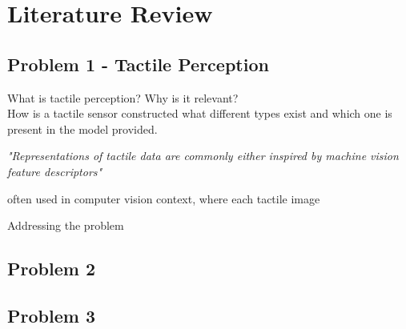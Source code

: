 
\chapter{Literature Review} \label{ch:litterature-review}



\section{Problem 1 - Tactile Perception} \label{sec:lit-rev-problem-1}

What is tactile perception? Why is it relevant? \\
How is a tactile sensor constructed \cite{recent-progress-in-technologies-for-tactile-sensors}
what different types exist and which one is present in the model provided.


\textit{"Representations of tactile data are commonly either inspired by machine vision feature descriptors"}

often used in computer vision context, where each tactile image 

Addressing the problem 





\section{Problem 2} \label{sec:lit-rev-problem-2}

\section{Problem 3} \label{sec:lit-rev-problem-3}